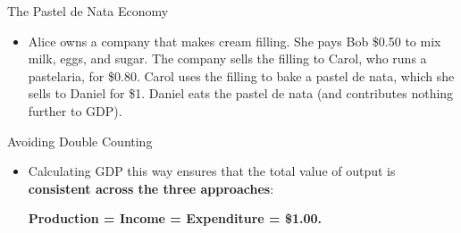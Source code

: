 \documentclass[10pt,aspectratio=169]{beamer}
\begin{document}
\begin{frame}{The Pastel de Nata Economy}
\begin{itemize}
    \item Alice owns a company that makes cream filling. She pays Bob \$0.50
    to mix milk, eggs, and sugar.
    \itemvso The company sells the filling to Carol, who runs a pastelaria, for \$0.80.
    \itemvso Carol uses the filling to bake a pastel de nata, which she sells to Daniel for \$1.
    \itemvso Daniel eats the pastel de nata (and contributes nothing further to GDP).
\end{itemize}
\begin{table}[ht!]
\centering
\captionsetup{labelformat=empty}
\caption{\small  GDP from the three approaches (in dollars)}
\vspace{0.2em}
\end{table}
\end{frame}

\begin{frame}{Avoiding Double Counting}
\begin{itemize}
    \itemvso It would be a \textbf{mistake} to add the value of the filling to
    the value of the pastel de nata, because the filling was \textbf{used up}
    in making the pastel de nata.

    
    \itemvso The \textbf{value added} by the pastelaria is the difference between
    the final value of the pastel de nata (\$1) and the value of the filling (\$0.80):
   \begin{align*}
   \text{Value added (Carol)} = 1.00 - 0.80 = 0.20
   \end{align*}    
    \item Calculating GDP this way ensures that the total value of output is 
    \textbf{consistent across the three approaches}:
    \begin{center}
    \textbf{Production = Income = Expenditure = \$1.00.}
    \end{center}
\end{itemize}
\end{frame}
\end{document}
